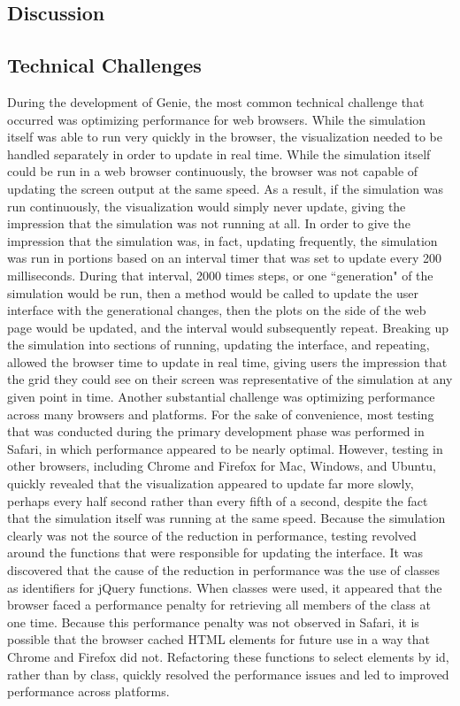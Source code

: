 \documentclass[12pt]{article}
\begin{document}
\begin{spacing}{1.6}
\section{Discussion}

\subsection{Technical Challenges}
During the development of Genie, the most common technical challenge that occurred was optimizing performance for web browsers. While the simulation itself was able to run very quickly in the browser, the visualization needed to be handled separately in order to update in real time. While the simulation itself could be run in a web browser continuously, the browser was not capable of updating the screen output at the same speed. As a result, if the simulation was run continuously, the visualization would simply never update, giving the impression that the simulation was not running at all. In order to give the impression that the simulation was, in fact, updating frequently, the simulation was run in portions based on an interval timer that was set to update every 200 milliseconds. During that interval, 2000 times steps, or one ``generation" of the simulation would be run, then a method would be called to update the user interface with the generational changes, then the plots on the side of the web page would be updated, and the interval would subsequently repeat. Breaking up the simulation into sections of running, updating the interface, and repeating, allowed the browser time to update in real time, giving users the impression that the grid they could see on their screen was representative of the simulation at any given point in time.\newline
\newline
Another substantial challenge was optimizing performance across many browsers and platforms. For the sake of convenience, most testing that was conducted during the primary development phase was performed in Safari, in which performance appeared to be nearly optimal. However, testing in other browsers, including Chrome and Firefox for Mac, Windows, and Ubuntu, quickly revealed that the visualization appeared to update far more slowly, perhaps every half second rather than every fifth of a second, despite the fact that the simulation itself was running at the same speed. Because the simulation clearly was not the source of the reduction in performance, testing revolved around the functions that were responsible for updating the interface. It was discovered that the cause of the reduction in performance was the use of classes as identifiers for jQuery functions. When classes were used, it appeared that the browser faced a performance penalty for retrieving all members of the class at one time. Because this performance penalty was not observed in Safari, it is possible that the browser cached HTML elements for future use in a way that Chrome and Firefox did not. Refactoring these functions to select elements by id, rather than by class, quickly resolved the performance issues and led to improved performance across platforms.


\end{spacing}
\end{document}
